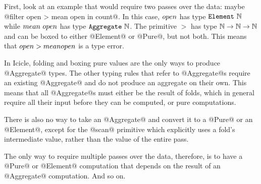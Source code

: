 First, look at an example that would require two passes over the data: maybe @filter open > mean open in count@.
In this case, $\mit{open}$ has type $\mathtt{Element}~\mathbb{N}$ while $\mit{mean~open}$ has type $\mathtt{Aggregate}~\mathbb{N}$.
The primitive $>$ has type $\mathbb{N} \to \mathbb{N} \to \mathbb{N}$ and can be boxed to either @Element@ or @Pure@, but not both.
This means that $\mit{open} > \mit{mean open}$ is a type error.

In Icicle, folding and boxing pure values are the only ways to produce @Aggregate@ types.
The other typing rules that refer to @Aggregate@s require an existing @Aggregate@ and do not produce an aggregate on their own.
This means that all @Aggregate@s must either be the result of folds, which in general require all their input before they can be computed, or pure computations.

There is also no way to take an @Aggregate@ and convert it to a @Pure@ or an @Element@, except for the @scan@ primitive which explicitly uses a fold's intermediate value, rather than the value of the entire pass.

The only way to require multiple passes over the data, therefore, is to have a @Pure@ or @Element@ computation that depends on the result of an @Aggregate@ computation.
And so on.



